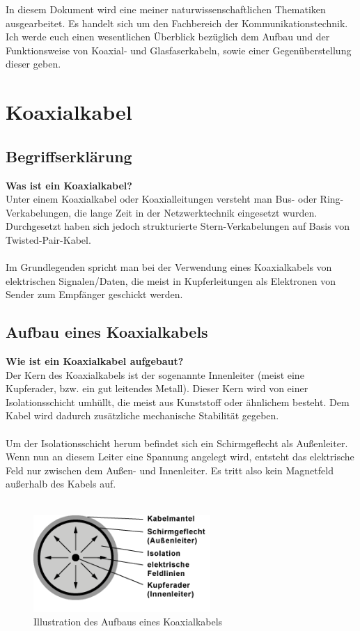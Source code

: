 \documentclass[11pt, a4paper]{article}
\begin{document}
In diesem Dokument wird eine meiner naturwissenschaftlichen Thematiken ausgearbeitet. Es handelt sich um den Fachbereich der Kommunikationstechnik. Ich werde euch einen wesentlichen Überblick bezüglich dem Aufbau und der Funktionsweise von Koaxial- und Glasfaserkabeln, sowie einer Gegenüberstellung dieser geben.

\section{Koaxialkabel \cite{koaxialkabel} \cite{koaxialkabel-wiki}} 

\subsection{Begriffserklärung}
\textbf{Was ist ein Koaxialkabel?}\\
Unter einem Koaxialkabel oder Koaxialleitungen versteht man Bus- oder Ring-Verkabelungen, die lange Zeit in der Netzwerktechnik eingesetzt wurden. Durchgesetzt haben sich jedoch strukturierte Stern-Verkabelungen auf Basis von Twisted-Pair-Kabel. \\ \\Im Grundlegenden spricht man bei der Verwendung eines Koaxialkabels von elektrischen Signalen/Daten, die meist in Kupferleitungen als Elektronen von Sender zum Empfänger geschickt werden.

\subsection{Aufbau eines Koaxialkabels}
\textbf{Wie ist ein Koaxialkabel aufgebaut?}\\
Der Kern des Koaxialkabels ist der sogenannte Innenleiter (meist eine Kupferader, bzw. ein gut leitendes Metall). Dieser Kern wird von einer Isolationsschicht umhüllt, die meist aus Kunststoff oder ähnlichem besteht. Dem Kabel wird dadurch zusätzliche mechanische Stabilität gegeben.\\ \\ Um der Isolationsschicht herum befindet sich ein Schirmgeflecht als Außenleiter. Wenn nun an diesem Leiter eine Spannung angelegt wird, entsteht das elektrische Feld nur zwischen dem Außen- und Innenleiter. Es tritt also kein Magnetfeld außerhalb des Kabels auf. \\ \\

\begin{figure}[h!]
	\centering
	\includegraphics[width=0.6\textwidth]{images/coax-aufbau}
	\caption{Illustration des Aufbaus eines Koaxialkabels \cite{koax-img}}
\end{figure}
\end{document}
